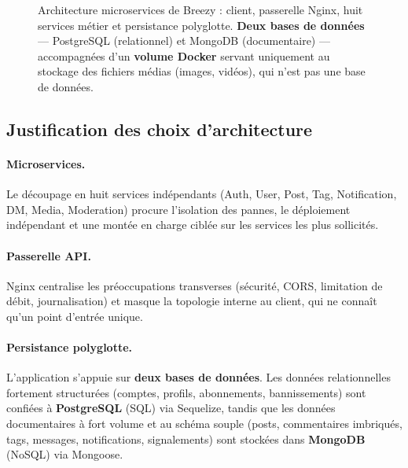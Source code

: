 \begin{figure}[H]
\caption{Architecture microservices de Breezy : client, passerelle Nginx, huit services métier et persistance polyglotte. \textbf{Deux bases de données} — PostgreSQL (relationnel) et MongoDB (documentaire) — accompagnées d'un \textbf{volume Docker} servant uniquement au stockage des fichiers médias (images, vidéos), qui n'est pas une base de données.}
\label{fig:archi}
\end{figure}

\newpage

\subsection{Justification des choix d'architecture}

\paragraph{Microservices.} Le découpage en huit services indépendants
(Auth, User, Post, Tag, Notification, DM, Media, Moderation) procure l'isolation
des pannes, le déploiement indépendant et une montée en charge ciblée sur les
services les plus sollicités.

\paragraph{Passerelle API.} Nginx centralise les préoccupations transverses
(sécurité, CORS, limitation de débit, journalisation) et masque la topologie
interne au client, qui ne connaît qu'un point d'entrée unique.

\paragraph{Persistance polyglotte.} L'application s'appuie sur \textbf{deux bases
de données}. Les données relationnelles fortement structurées (comptes, profils,
abonnements, bannissements) sont confiées à \textbf{PostgreSQL} (SQL) via Sequelize,
tandis que les données documentaires à fort volume et au schéma souple (posts,
commentaires imbriqués, tags, messages, notifications, signalements) sont stockées
dans \textbf{MongoDB} (NoSQL) via Mongoose.

